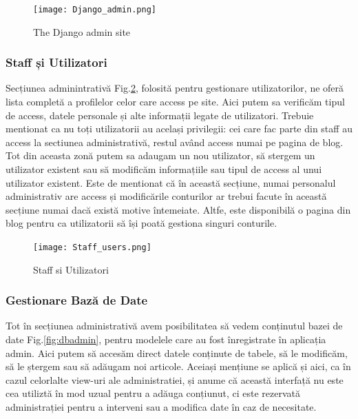 \documentclass[11pt]{scrartcl} %
\begin{document}
\begin{figure}[h] %
	\centering
	\texttt{[image: Django\_admin.png]} %
	\caption{The Django admin site}
	\label{fig:djadmin}
\end{figure}


\subsubsection{Staff și Utilizatori}



Secțiunea adminintrativă Fig.\ref{fig:staff&users}, folosită pentru gestionare utilizatorilor, ne oferă lista completă a profilelor celor care access pe site. Aici putem sa verificăm tipul de access, datele personale și alte informații legate de utilizatori. Trebuie mentionat ca nu toți utilizatorii au același privilegii: cei care fac parte din staff au access la sectiunea administrativă, restul având access numai pe pagina de blog. \\
Tot din aceasta zonă putem sa adaugam un nou utilizator, să stergem un utilizator existent sau să modificăm informațiile sau tipul de access al unui utilizator existent. Este de mentionat că în această secțiune, numai personalul administrativ are access și modificările conturilor ar trebui facute în această secțiune numai dacă există motive întemeiate. Altfe, este disponibilă o pagina din blog pentru ca utilizatorii să își poată gestiona singuri conturile.

\begin{figure}[h] %
	\centering
	\texttt{[image: Staff\_users.png]} %
	\caption{Staff si Utilizatori}
	\label{fig:staff&users}
\end{figure}


\subsubsection{Gestionare Bază de Date}

Tot în secțiunea administrativă avem posibilitatea să vedem conținutul bazei de date Fig.\ref{fig:dbadmin}, pentru modelele care au fost înregistrate în aplicația admin. Aici putem să accesăm direct datele conținute de  tabele, să le modificăm, să le ștergem sau să adăugam noi articole. Aceiași mențiune se aplică și aici, ca în cazul celorlalte view-uri ale administratiei, și anume că această interfață nu este cea utiliztă în mod uzual pentru a adăuga conțiunut, ci este rezervată administrației pentru a interveni sau a modifica date în caz de necesitate.
\end{document}
